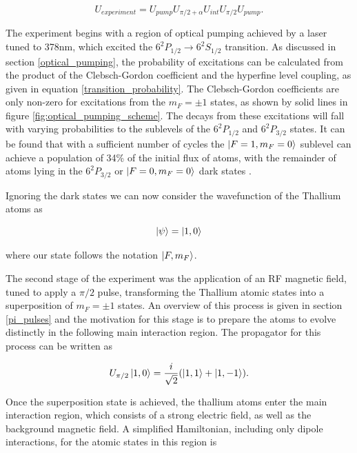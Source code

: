 \begin{equation} \label{experiment_propagator}
    U_{experiment} = U_{pump} U_{\pi/2 + \alpha} U_{int} U_{\pi/2} U_{pump}.
\end{equation}

The experiment begins with a region of optical pumping achieved by a laser tuned to 378nm, which excited the $6^2P_{1/2} \rightarrow 6^2S_{1/2}$ transition. As discussed in section \ref{optical_pumping}, the probability of excitations can be calculated from the product of the Clebsch-Gordon coefficient and the hyperfine level coupling, as given in equation \ref{transition_probability}. The Clebsch-Gordon coefficients are only non-zero for excitations from the $m_F = \pm 1$ states, as shown by solid lines in figure \ref{fig:optical_pumping_scheme}. The decays from these excitations will fall with varying probabilities to the sublevels of the $6^2P_{1/2}$ and $6^2P_{3/2}$ states. It can be found that with a sufficient number of cycles the $\ket{F=1,m_F=0}$ sublevel can achieve a population of 34\% of the initial flux of atoms, with the remainder of atoms lying in the $6^2P_{3/2}$ or $\ket{F=0,m_F=0}$ dark states \cite{Regan_2001}.

Ignoring the dark states we can now consider the wavefunction of the Thallium atoms as

\begin{equation} \label{pumped_wavefunction}
    \ket{\psi} = \ket{1, 0}
\end{equation}

where our state follows the notation $\ket{F,m_F}$.

The second stage of the experiment was the application of an RF magnetic field, tuned to apply a $\pi/2$ pulse, transforming the Thallium atomic states into a superposition of $m_F = \pm 1$ states. An overview of this process is given in section \ref{pi_pulses} and the motivation for this stage is to prepare the atoms to evolve distinctly in the following main interaction region. The propagator for this process can be written as

\begin{equation} \label{proagated_pumped_wavefunction}
    U_{\pi / 2} \ket{1,0} = \frac{i}{\sqrt{2}} (\ket{1,1} + \ket{1,-1}).
\end{equation}

Once the superposition state is achieved, the thallium atoms enter the main interaction region, which consists of a strong electric field, as well as the background magnetic field. A simplified Hamiltonian, including only dipole interactions, for the atomic states in this region is

